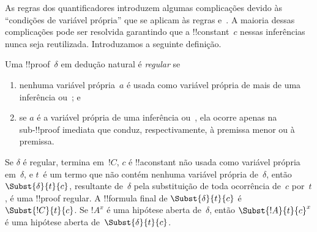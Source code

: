 \documentclass[../../../include/open-logic-section]{subfiles}
\begin{document}


As regras dos quantificadores introduzem algumas complicações devido
às ``condições de variável própria'' que se aplicam às regras
\Elim{\lexists} e~\Intro{\lforall}. A maioria dessas complicações pode
ser resolvida garantindo que a !!{constant}~$c$ nessas inferências
nunca seja reutilizada. Introduzamos a seguinte definição.

\begin{defn}
Uma !!{proof}~$\delta$ em dedução natural é \emph{regular} se
\begin{enumerate}
  \item nenhuma variável própria~$a$ é usada como variável própria de
  mais de uma inferência \Elim{\lexists} ou~\Intro{\lforall}; e
  \item se $a$ é a variável própria de uma inferência \Elim{\lexists}
  ou~\Intro{\lforall}, ela ocorre apenas na sub-!!{proof} imediata que
  conduz, respectivamente, à premissa menor ou à premissa.
\end{enumerate}
\end{defn}

\begin{lem} Se $\delta$ é regular, termina
em~$!C$, $c$ é !!a{constant} não usada como variável própria
em~$\delta$, e $t$~é um termo que não contém nenhuma variável própria
de~$\delta$, então $\Subst{\delta}{t}{c}$, resultante de~$\delta$ pela
substituição de toda ocorrência de~$c$ por~$t$, é uma !!{proof}
regular. A !!{formula} final de $\Subst{\delta}{t}{c}$ é
$\Subst{!C}{t}{c}$. Se $!A^x$ é uma hipótese aberta de~$\delta$, então
$\Subst{!A}{t}{c}^x$ é uma hipótese aberta de~$\Subst{\delta}{t}{c}$.
\end{lem}
\end{document}
